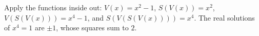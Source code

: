 Apply the functions inside out: $V(x)=x^2-1$, $S(V(x))=x^2$, $V(S(V(x)))=x^4-1$, and $S(V(S(V(x))))=x^4$. The real solutions of $x^4=1$ are $\pm1$, whose squares sum to $\boxed2$.
